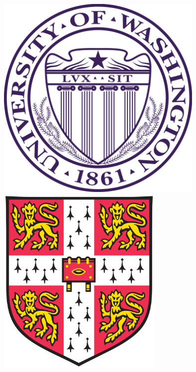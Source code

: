 \documentclass[a0, landscape]{a0poster}
\begin{document}
\begin{minipage}[b]{0.19\linewidth}
\includegraphics[width=10cm]{UWlogo.png}
\includegraphics[width=8cm]{Camlogo.png}
\end{minipage}

\vspace{0.5cm} %

\end{document}
